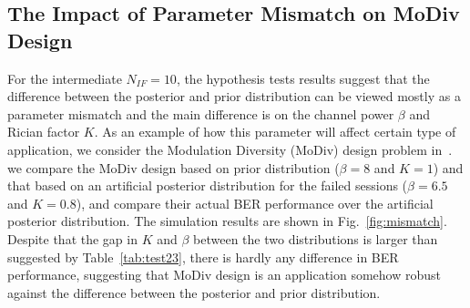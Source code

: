 \documentclass[journal,draftcls,onecolumn,12pt,twoside]{IEEEtran}
\begin{document}
\subsection{The Impact of Parameter Mismatch on MoDiv Design}
For the intermediate $N_{IF} = 10$, the hypothesis tests results suggest that
the difference between the posterior and prior distribution can be viewed
mostly as a parameter mismatch and the main difference is on the channel power
$\beta$ and Rician factor $K$. As an example of how this parameter will affect
certain type of application, we consider the Modulation Diversity (MoDiv) design
problem in~\cite{wu2015modulation}\cite{harvind2005symbol}. we compare the
MoDiv design based on prior distribution ($\beta = 8$ and $K = 1$) and that
based on an artificial posterior distribution for the failed sessions ($\beta =
6.5$ and $K = 0.8$), and compare their actual BER performance over the
artificial posterior distribution.
The simulation results are shown in Fig.~\ref{fig:mismatch}.
Despite that the gap in $K$ and $\beta$ between the two distributions is larger
than suggested by Table~\ref{tab:test23}, there is hardly any difference in BER
performance, suggesting that MoDiv design is an application somehow robust
against the difference between the posterior and prior distribution.
\end{document}

